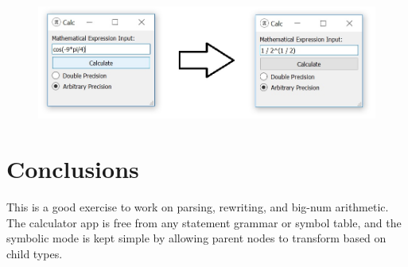 \documentclass[12pt]{article}
\begin{document}
\begin{figure}[h]
	\centering
		\includegraphics[width=1.00\textwidth]{Fig/Symbolic.jpg}
	\label{fig:symbolic}
\end{figure}

\section{Conclusions}

This is a good exercise to work on parsing, rewriting, and big-num arithmetic. The calculator app is free from any statement grammar or symbol table, and the symbolic mode is kept simple by allowing parent nodes to transform based on child types.
\end{document}
